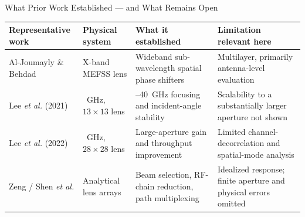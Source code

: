 \begin{frame}[t]{What Prior Work Established --- and What Remains Open}
\scriptsize
\setlength{\tabcolsep}{3pt}
\renewcommand{\arraystretch}{1.12}
\newcommand{\grayrowrule}{%
  \noalign{\vskip 1pt\begingroup\color{gray!35}\hrule height 0.3pt\endgroup\vskip 1pt}}
\begin{tabularx}{\linewidth}{
  >{\raggedright\arraybackslash}p{2.05cm}
  >{\raggedright\arraybackslash}p{2.20cm}
  >{\raggedright\arraybackslash}X
  >{\raggedright\arraybackslash}X}
  \toprule
  \textbf{Representative work} & \textbf{Physical system} &
  \textbf{What it established} & \textbf{Limitation relevant here} \\
  \midrule
  Al-Joumayly \& Behdad \cite{Al-Joumayly2011} & X-band MEFSS lens &
  Wideband sub-wavelength spatial phase shifters &
  Multilayer, primarily antenna-level evaluation \\
  \grayrowrule
  Lee \textit{et al.} (2021) \cite{Lee2021} & 38~GHz, $13\!\times\!13$ lens &
  35--40~GHz focusing and incident-angle stability &
  Scalability to a substantially larger aperture not shown \\
  \grayrowrule
  Lee \textit{et al.} (2022) \cite{Lee2022Large} & 28~GHz, $28\!\times\!28$ lens &
  Large-aperture gain and throughput improvement &
  Limited channel-decorrelation and spatial-mode analysis \\
  \grayrowrule
  Zeng / Shen \textit{et al.} \cite{Zeng2016,Shen2019} & Analytical lens arrays &
  Beam selection, RF-chain reduction, path multiplexing &
  Idealized response; finite aperture and physical errors omitted \\
  \bottomrule
\end{tabularx}

\vspace{0.15cm}
\begin{columns}[T,onlytextwidth]
\end{columns}


\end{frame}
